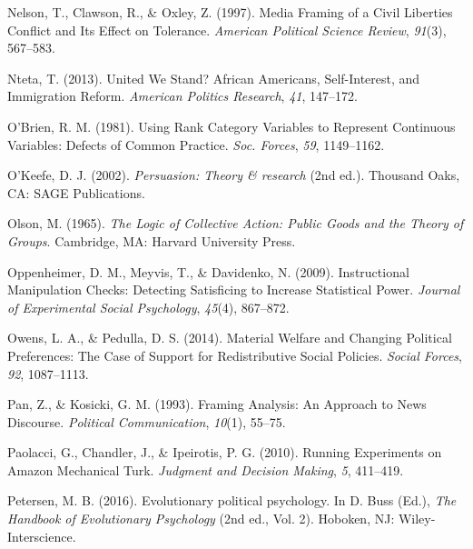 \documentclass[12pt,econ]{sources/authesis}
\newenvironment{CSLReferences}%
  {}%
  {\par}
\begin{document}
\begin{CSLReferences}{1}{0}
\leavevmode{}%
Nelson, T., Clawson, R., \& Oxley, Z. (1997). Media {Framing} of a {Civil} {Liberties} {Conflict} and {Its} {Effect} on {Tolerance}. \emph{American Political Science Review}, \emph{91}(3), 567--583.

\leavevmode{}%
Nteta, T. (2013). {United We Stand? African Americans, Self-Interest, and Immigration Reform}. \emph{American Politics Research}, \emph{41}, 147--172.

\leavevmode{}%
O'Brien, R. M. (1981). {Using Rank Category Variables to Represent Continuous Variables: Defects of Common Practice}. \emph{Soc. Forces}, \emph{59}, 1149--1162.

\leavevmode{}%
O'Keefe, D. J. (2002). \emph{Persuasion: Theory \& research} (2nd ed.). Thousand Oaks, CA: SAGE Publications.

\leavevmode{}%
Olson, M. (1965). \emph{The {Logic} of {Collective} {Action}: {Public} {Goods} and the {Theory} of {Groups}}. Cambridge, MA: Harvard University Press.

\leavevmode{}%
Oppenheimer, D. M., Meyvis, T., \& Davidenko, N. (2009). {Instructional Manipulation Checks: Detecting Satisficing to Increase Statistical Power}. \emph{Journal of Experimental Social Psychology}, \emph{45}(4), 867--872.

\leavevmode{}%
Owens, L. A., \& Pedulla, D. S. (2014). {Material Welfare and Changing Political Preferences: The Case of Support for Redistributive Social Policies}. \emph{Social Forces}, \emph{92}, 1087--1113.

\leavevmode{}%
Pan, Z., \& Kosicki, G. M. (1993). Framing {Analysis}: {An} {Approach} to {News} {Discourse}. \emph{Political Communication}, \emph{10}(1), 55--75.

\leavevmode{}%
Paolacci, G., Chandler, J., \& Ipeirotis, P. G. (2010). {Running Experiments on Amazon Mechanical Turk}. \emph{Judgment and Decision Making}, \emph{5}, 411--419.

\leavevmode{}%
Petersen, M. B. (2016). {Evolutionary political psychology}. In D. Buss (Ed.), \emph{{The Handbook of Evolutionary Psychology}} (2nd ed., Vol. 2). Hoboken, NJ: Wiley-Interscience.


\end{CSLReferences}
\end{document}
